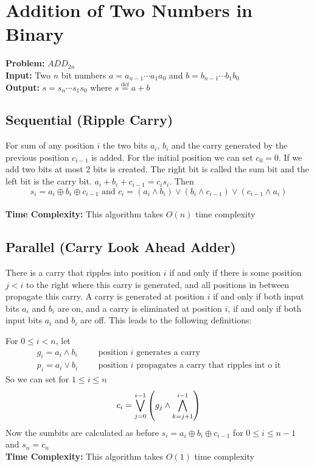 \section{Addition of Two Numbers in Binary}
\textbf{Problem:} $ADD_{2n}$\\
\textbf{Input:} Two $n$ bit numbers $a=a_{n-1}\cdots a_1a_0$ and $b=b_{n-1}\cdots b_1b_0$\\
\textbf{Output:} $s=s_n\cdots s_1s_0$ where $s\overset{\text{def}}{=}a+b$\\

\subsection{Sequential (Ripple Carry)} For sum of any position $i$ the two bits $a_i$, $b_i$ and the carry generated by the previous position $c_{i-1}$ is added. For the initial position we can set $c_0=0$. If we add two bits at most 2 bits is created. The right bit is called the sum bit and the left bit is the carry bit. $a_i+b_i+c_{i-1}=c_is_i$. Then $$s_i=a_i\oplus b_i \oplus c_{i-1}\text{ and } c_i=(a_{i}\wedge b_{i})\vee (b_{i} \wedge c_{i-1}) \vee (c_{i-1} \wedge a_i)$$\\
\textbf{Time Complexity:} This algorithm takes $O(n)$ time complexity

\subsection{Parallel (Carry Look Ahead Adder)}
There is a carry that ripples into position $i$ if and only if there is some position $j < i$ to the right where this carry is generated, and all positions in between propagate this carry. A carry is generated at position $i$ if and only if both input bits $a_i$ and $b_i$ are on, and a carry is eliminated at position $i$, if and only if both input bits $a_i$ and $b_i$ are off. This leads to the following definitions: 

For $0 \leq  i < n$, let\begin{align*}
	g_i=a_i\wedge b_i &  &  & \text{position $i$ generates a carry}                        \\
	p_i=a_i\vee b_i   &  &  & \text{position $i$ propagates a carry that ripples int o it}
\end{align*}
So we can set for $1\leq i \leq n$ $$c_i=\bigvee_{j=0}^{i-1}\left( g_j\wedge \bigwedge_{k=j+1}^{i-1} \right)$$ Now the sumbits are calculated as before $s_i=a_i\oplus b_i \oplus c_{i-1}$ for $0\leq i\leq n-1$ and $s_n=c_n$\\
\textbf{Time Complexity:} This algorithm takes $O(1)$ time complexity


